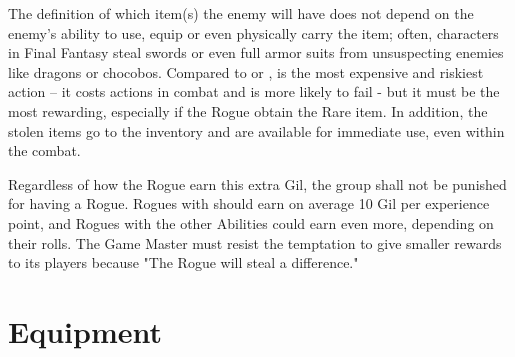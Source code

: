 \begin{multicols}{2}
The definition of which item(s) the enemy will have does not depend on the enemy's ability to use, equip or even physically carry the item; often, characters in Final Fantasy steal swords or even full armor suits from unsuspecting enemies like dragons or chocobos. Compared to  or ,  is the most expensive and riskiest action – it costs actions in combat and is more likely to fail - but it must be the most rewarding, especially if the Rogue obtain the Rare item. In addition, the stolen items go to the inventory and are available for immediate use, even within the combat.

Regardless of how the Rogue earn this extra Gil, the group shall not be punished for having a Rogue. Rogues with  should earn on average 10 Gil per experience point, and Rogues with the other Abilities could earn even more, depending on their rolls. The Game Master must resist the temptation to give smaller rewards to its players because "The Rogue will steal a difference."
\end{multicols}
\clearpage

\section{Equipment}
\label{sec:inv-equip}

